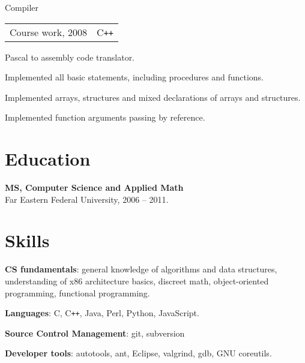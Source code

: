 \documentclass[a4paper]{article}
\begin{document}
\begin{multicols}{2}
		\begin{project2}{Compiler}{\begin{tabular}{@{}l|l}Course work, 2008 & C\texttt{++}\\\end{tabular}}
			Pascal to assembly code translator.
			\begin{items}
				\item Implemented all basic statements, including procedures and functions.
				\item Implemented arrays, structures and mixed declarations of arrays and structures.
				\item Implemented function arguments passing by reference.
			\end{items}
		\end{project2}
	\end{multicols}

	\section{Education}
		\begin{multicols}{2}
			\raggedcolumns
			\begin{items}
				\item \textbf{MS, Computer Science and Applied Math}\\
				Far Eastern Federal University, 2006 -- 2011.
			\end{items}
			\columnbreak
			\hspace{10mm}
		\end{multicols}

	\section{Skills}
	\begin{multicols}{2}
		\raggedcolumns
		\begin{items}
			\item \textbf{CS fundamentals}: general knowledge of algorithms and data structures, understanding of x86 architecture basics, discreet math, object-oriented programming, functional programming.
			\item \textbf{Languages}: C, C\texttt{++}, Java, Perl, Python, JavaScript.
			\columnbreak
			\item \textbf{Source Control Management}: git, subversion
			\item \textbf{Developer tools}: autotools, ant, Eclipse, valgrind, gdb, GNU coreutils.
		\end{items}
	\end{multicols}
\end{document}

